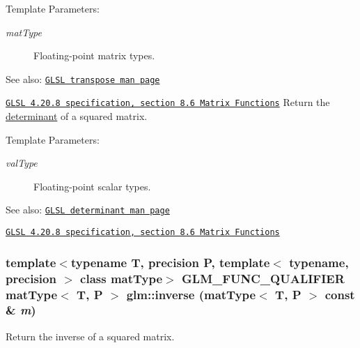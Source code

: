 \begin{Desc}
\item[Template Parameters:]
\begin{description}
\item[{\em matType}]Floating-point matrix types.\end{description}
\end{Desc}
\begin{Desc}
\item[See also:]\href{http://www.opengl.org/sdk/docs/manglsl/xhtml/transpose.xml}{\tt GLSL transpose man page} 

\href{http://www.opengl.org/registry/doc/GLSLangSpec.4.20.8.pdf}{\tt GLSL 4.20.8 specification, section 8.6 Matrix Functions} Return the \hyperlink{group__core__func__matrix_g704c9bfebc2533c6715691de6473f90b}{determinant} of a squared matrix.\end{Desc}
\begin{Desc}
\item[Template Parameters:]
\begin{description}
\item[{\em valType}]Floating-point scalar types.\end{description}
\end{Desc}
\begin{Desc}
\item[See also:]\href{http://www.opengl.org/sdk/docs/manglsl/xhtml/determinant.xml}{\tt GLSL determinant man page} 

\href{http://www.opengl.org/registry/doc/GLSLangSpec.4.20.8.pdf}{\tt GLSL 4.20.8 specification, section 8.6 Matrix Functions} \end{Desc}
\hypertarget{group__core__func__matrix_g4b56decdc6560a13b616c6312bdcc17e}{
\subsubsection[inverse]{\setlength{\rightskip}{0pt plus 5cm}template$<$typename T, precision P, template$<$ typename, precision $>$ class matType$>$ GLM\_\-FUNC\_\-QUALIFIER matType$<$ T, P $>$ glm::inverse (matType$<$ T, P $>$ const \& {\em m})}}
\label{group__core__func__matrix_g4b56decdc6560a13b616c6312bdcc17e}


Return the inverse of a squared matrix.

